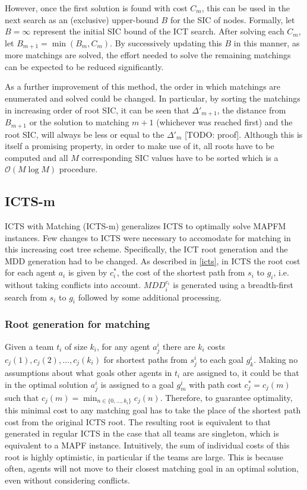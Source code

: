 \documentclass[english]{article}
\begin{document}
	However, once the first solution is found with cost $C_m$, this can be used in the next search as an (exclusive) upper-bound $B$ for the SIC of nodes. Formally, let $B = \infty$ represent the initial SIC bound of the ICT search. After solving each $C_m$, let $B_{m+1} = \min(B_m,C_m)$. By successively updating this $B$ in this manner, as more matchings are solved, the effort needed to solve the remaining matchings can be expected to be reduced significantly.
	
	As a further improvement of this method, the order in which matchings are enumerated and solved could be changed. In particular, by sorting the matchings in increasing order of root SIC, it can be seen that $\Delta'_{m + 1}$, the distance from $B_{m+1}$ or the solution to matching $m + 1$ (whichever was reached first) and the root SIC, will always be less or equal to the $\Delta'_m$ [TODO: proof]. Although this is itself a promising property, in order to make use of it, all roots have to be computed and all $M$ corresponding SIC values have to be sorted which is a $\mathcal{O}(M\log M)$ procedure. 
	
	\subsection{ICTS-m}
	ICTS with Matching (ICTS-m) generalizes ICTS to optimally solve MAPFM instances. Few changes to ICTS were necessary to accomodate for matching in this increasing cost tree scheme. Specifically, the ICT root generation and the MDD generation had to be changed. As described in \ref{icts}, in ICTS the root cost for each agent $a_i$ is given by $c^*_i$, the cost of the shortest path from $s_i$ to $g_i$, i.e. without taking conflicts into account. $MDD_i^{c_i}$ is generated using a breadth-first search from $s_i$ to $g_i$ followed by some additional processing.
	\subsubsection{Root generation for matching}
	Given a team $t_i$ of size $k_i$, for any agent $a_j^i$ there are $k_i$ costs $c_j(1),c_j(2),\ldots,c_j(k_i)$ for shortest paths from $s_j^i$ to each goal $g_k^i$. Making no assumptions about what goals other agents in $t_i$ are assigned to, it could be that in the optimal solution $a_j^i$ is assigned to a goal $g_{m}^i$ with path cost $c^*_j = c_j(m)$ such that $c_j(m) = \min_{n\in\{0,\ldots,k_i\}} c_j(n)$. Therefore, to guarantee optimality, this minimal cost to any matching goal has to take the place of the shortest path cost from the original ICTS root. The resulting root is equivalent to that generated in regular ICTS in the case that all teams are singleton, which is equivalent to a MAPF instance. Intuitively, the sum of individual costs of this root is highly optimistic, in particular if the teams are large. This is because often, agents will not move to their closest matching goal in an optimal solution, even without considering conflicts.
	
\end{document}
